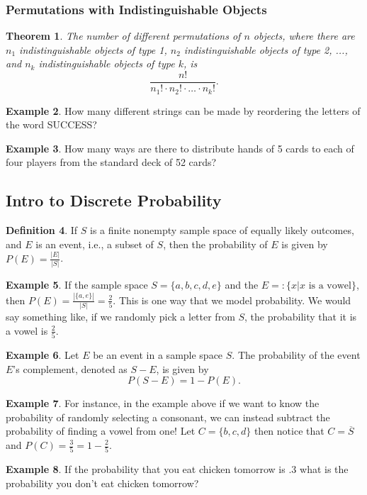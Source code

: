 \documentclass[letterpaper,10pt]{article}
\theoremstyle{plain}
\newtheorem{thm}{Theorem}[section]
\theoremstyle{definition}
\newtheorem{defn}[thm]{Definition}
\newtheorem{exmp}[thm]{Example}
\theoremstyle{remark}
\begin{document}
\subsubsection{Permutations with Indistinguishable Objects}

\begin{thm}
The number of different permutations of $n$ objects, where there are $n_1$ indistinguishable objects of type 1, $n_2$ indistinguishable objects of type 2, ..., and $n_k$ indistinguishable objects of type $k$, is
\[
\frac{n!}{n_1! \cdot n_2! \cdot \ldots \cdot n_k!}.
\]

\end{thm}

\begin{exmp}
How many different strings can be made by reordering the letters of the word SUCCESS?\vspace{3cm}
\end{exmp}


\begin{exmp}
How many ways are there to distribute hands of 5 cards to each of four players from the standard
deck of 52 cards?
\end{exmp}
\subsection{Intro to Discrete Probability}
\begin{defn}
    If $S$ is a finite nonempty sample space of equally likely outcomes, and $E$ is an event, i.e., a subset of $S$, then the probability of $E$ is given by $P(E) = \frac{|E|}{|S|}$.
\end{defn}

\begin{exmp}
If the sample space $S=\{a,b,c,d,e\}$ and the $E=:\{x| x \text{ is a vowel}\}$, then $P(E)=\frac{|\{a,e\}|}{|S|}=\frac{2}{5}$. 
\newline
This is one way that we model probability. We would say something like, if we randomly pick a letter from $S$, the probability that it is a vowel is $\frac{2}{5}$.
\newline

\end{exmp}

\begin{exmp}
    Let $E$ be an event in a sample space $S$. The probability of the event $E$'s complement, denoted as $S - E$, is given by
    \[
    P(S-E) = 1 - P(E).
    \]
\end{exmp}
\begin{exmp}
For instance, in the example above if we want to know the probability of randomly selecting a consonant, we can instead subtract the probability of finding a vowel from one!
\newline
Let $C=\{b,c,d\}$ then notice that $C=\overline{S}$ and $P(C)=\frac{3}{5}=1-\frac{2}{5}$.
\newline
\end{exmp}
\begin{exmp}
If the probability that you eat chicken tomorrow is $.3$ what is the probability you don't eat chicken tomorrow?
\vspace{2cm}
\end{exmp}
\end{document}
